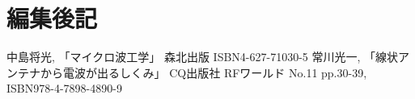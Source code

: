 \chapter*{編集後記}


\begin{thebibliography}{9}
   中島将光,
    「マイクロ波工学」 森北出版 ISBN4-627-71030-5
   常川光一, 
    「線状アンテナから電波が出るしくみ」 CQ出版社 RFワールド No.11 pp.30-39, ISBN978-4-7898-4890-9
\end{thebibliography}